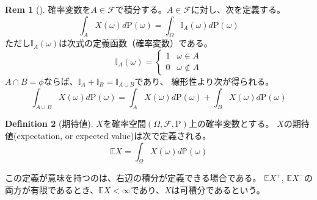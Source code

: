 \documentclass{ltjsarticle}
\numberwithin{equation}{subsection}
\theoremstyle{definition}
\newtheorem{dfn}{Definition}[subsection]
\newtheorem{rem}[dfn]{Rem}
\begin{document}
\begin{rem}[]
    確率変数を$A \in \mathcal{F}$で積分する。$A \in \mathcal{F}$に対し、次を定義する。
    \begin{equation}
        \int_{A} X(\omega) d\mathrm{P} (\omega) = \int_{\Omega} \mathbb{I}_A(\omega) d\mathrm{P} (\omega)
    \end{equation}
    ただし$\mathbb{I}_A(\omega)$は次式の定義函数（確率変数）である。
    \begin{equation}
        \mathbb{I}_A(\omega) =
        \begin{cases}
            1 & \omega \in A \\
            0 & \omega \notin A 
        \end{cases}
    \end{equation}
    $A \cap B = \phi$ならば、$\mathbb{I}_A + \mathbb{I}_B = \mathbb{I}_{A\cup B}$であり、
    線形性より次が得られる。
    \begin{equation}
        \int_{A\cup B} X(\omega) d\mathrm{P}(\omega) = \int_{A} X(\omega) d\mathrm{P} (\omega) + \int_{B} X(\omega) d\mathrm{P} (\omega)
    \end{equation}
\end{rem}


\begin{dfn}[期待値]
    $X$を確率空間$(\Omega , \mathcal{F} , \mathrm{P})$上の確率変数とする。
    $X$の期待値(expectation, or expected value)は次で定義される。
    \begin{equation}
        \mathbb{E}X = \int_{\Omega} X(\omega) d\mathbb{P} (\omega)
    \end{equation}
\end{dfn}
この定義が意味を持つのは、右辺の積分が定義できる場合である。
$\mathbb{E}X^+$, $\mathbb{E}X^-$の両方が有限であるとき、$\mathbb{E}X < \infty$であり、$X$は可積分であるという。
\end{document}
